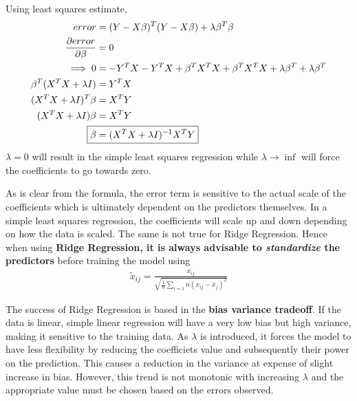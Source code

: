 \documentclass[11pt, a4paper]{article}
\begin{document}
    Using least squares estimate,
    \begin{align*}
        error &= (Y-X\beta)^{T}(Y-X\beta) + \lambda \beta^{T}\beta\\
        \frac{\partial error}{\partial \beta} &= 0\\
        \implies 0 &= -Y^{T}X - Y^{T}X + \beta^{T}X^{T}X + \beta^{T}X^{T}X + \lambda \beta^{T} + \lambda \beta^{T}\\
        \beta^{T}(X^{T}X + \lambda I) &= Y^{T}X\\
        (X^{T}X + \lambda I)^{T}\beta &= X^{T}Y\\
        (X^{T}X + \lambda I)\beta &= X^{T}Y\\
        \Aboxed{\beta &= (X^{T}X + \lambda I)^{-1}X^{T}Y}  
    \end{align*}
    $\lambda = 0$ will result in the simple least squares regression while $\lambda \to \inf$ will force the coefficients to go towards zero.\newline

    As is clear from the formula, the error term is sensitive to the actual scale of the coefficients which is ultimately dependent on the predictors themselves. In a simple least squares regression, the coefficients will scale up and down depending on how the data is scaled. The same is not true for Ridge Regression.\newline
    Hence when using \textbf{Ridge Regression, it is always advisable to \emph{standardize} the predictors} before training the model using
    \begin{align*}
        \tilde{x}_{ij} = \frac{x_{ij}}{\sqrt{\frac{1}{n}\sum_{i=1}{n}(x_{ij}-\bar{x}_{j})^{2}}}
    \end{align*}

    The success of Ridge Regression is based in the \textbf{bias variance tradeoff}. If the data is linear, simple linear regression will have a very low bias but high variance, making it sensitive to the training data. As $\lambda$ is introduced, it forces the model to have less flexibility by reducing the coefficiets value and subsequently their power on the prediction. This causes a reduction in the variance at expense of slight increase in bias. However, this trend is not monotonic with increasing $\lambda$ and the appropriate value must be chosen based on the errors observed. 
\end{document}
